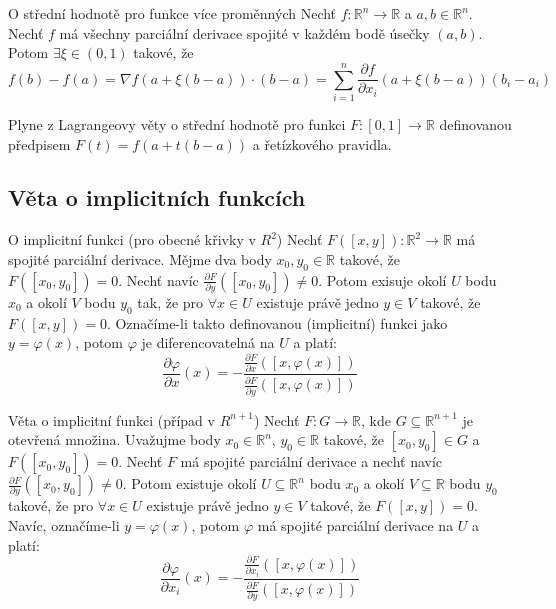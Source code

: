 \begin{vetaN}{O střední hodnotě pro funkce více proměnných}
Nechť $f: \mathbb{R}^n \rightarrow \mathbb{R}$ a $a, b \in \mathbb{R}^n$. Nechť $f$ má všechny parciální derivace spojité v každém bodě úsečky $(a, b)$. Potom $\exists \xi \in (0, 1)$ takové, že
$$f(b) - f(a) = \nabla f(a + \xi(b - a)) \cdot (b - a) = \sum_{i=1}^n\frac{\partial f}{\partial x_i}(a + \xi(b - a))(b_i - a_i)$$

\begin{dukaz}
Plyne z Lagrangeovy věty o střední hodnotě pro funkci $F:[0,1]\to\mathbb{R}$ definovanou předpisem $F(t)=f(a+t(b-a))$ a řetízkového pravidla.
\end{dukaz}
\end{vetaN}

\subsection{Věta o implicitních funkcích}

\begin{vetaN}{O implicitní funkci (pro obecné křivky v $R^2$)}
Nechť $F([x,y]): \mathbb{R}^2 \rightarrow \mathbb{R}$ má spojité parciální derivace. Mějme dva body $x_0, y_0 \in \mathbb{R}$ takové, že $F([x_0, y_0]) = 0$.  Nechť navíc $\frac{\partial F}{\partial y}([x_0, y_0]) \neq 0$. Potom exisuje okolí $U$ bodu $x_0$ a okolí $V$ bodu $y_0$ tak, že pro $\forall x \in U$ existuje právě jedno $y \in V$ takové, že $F([x, y]) = 0$. Označíme-li takto definovanou (implicitní) funkci jako $y = \varphi(x)$, potom $\varphi$ je diferencovatelná na $U$ a platí:
$$\frac{\partial \varphi}{\partial x}(x) = -\frac{\frac{\partial F}{\partial x}([x,\varphi(x)])}{\frac{\partial F}{\partial y}([x,\varphi(x)])}$$
\end{vetaN}

\begin{vetaN}{Věta o implicitní funkci (případ v $R^{n + 1}$)}
Nechť $F: G \rightarrow \mathbb{R}$, kde $G \subseteq \mathbb{R}^{n+1}$ je otevřená množina. Uvažujme body $x_0 \in \mathbb{R}^n$, $y_0 \in \mathbb{R}$ takové, že $[x_0, y_0] \in G$ a $F([x_0, y_0]) = 0$. Nechť $F$ má spojité parciální derivace a nechť navíc $\frac{\partial F}{\partial y}([x_0, y_0]) \neq 0$. Potom existuje okolí $U \subseteq \mathbb{R}^n$ bodu $x_0$ a okolí $V \subseteq \mathbb{R}$ bodu $y_0$ takové, že pro $\forall x \in U$ existuje právě jedno $y \in V$ takové, že $F([x,y]) = 0$. Navíc, označíme-li $y = \varphi(x)$, potom $\varphi$ má spojité parciální derivace na $U$ a platí:
$$\frac{\partial \varphi}{\partial x_i}(x) = -\frac{\frac{\partial F}{\partial x_i}([x, \varphi(x)])}{\frac{\partial F}{\partial y}([x, \varphi(x)])}$$
\end{vetaN}

